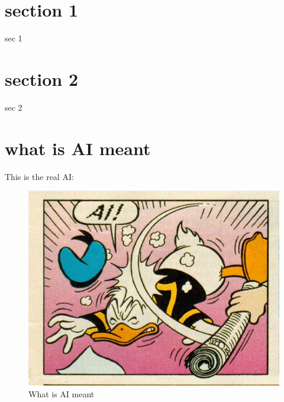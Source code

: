 \section{section 1}
sec 1
\section{section 2}
sec 2
\section{what is AI meant}
This is the real AI\cite{art1}: 
\begin{figure}[htbp] %
   \centering
   \includegraphics[width=15cm]{images/ai.jpg} 
   \caption{What is AI meant}
   \label{fig:ai}
\end{figure}